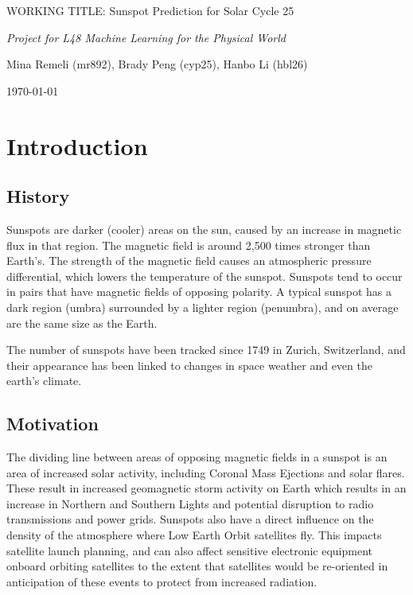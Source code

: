 \documentclass[11pt]{article}
\begin{document}
\centerline{\Large WORKING TITLE: Sunspot Prediction for Solar Cycle 25}
\vspace{2em}
\centerline{\Large \emph{Project for L48 Machine Learning for the Physical World}}
\vspace{2em}
\centerline{\large Mina Remeli (mr892), Brady Peng (cyp25), Hanbo Li (hbl26)}
\vspace{1em}
\centerline{\today}
\vspace{1em}


\section{Introduction}
\subsection{History}
Sunspots are darker (cooler) areas on the sun, caused by an increase in magnetic flux in that region. 
The magnetic field is around 2,500 times stronger than Earth’s. 
The strength of the magnetic field causes an atmospheric pressure differential, which lowers the temperature of the sunspot. 
Sunspots tend to occur in pairs that have magnetic fields of opposing polarity. 
A typical sunspot has a dark region (umbra) surrounded by a lighter region (penumbra), and on average are the same size as the Earth. 

The number of sunspots have been tracked since 1749 in Zurich, Switzerland, and their appearance has been linked to changes in space weather and even the earth’s climate.

\subsection{Motivation}
The dividing line between areas of opposing magnetic fields in a sunspot is an area of increased solar activity, including Coronal Mass Ejections and solar flares. 
These result in increased geomagnetic storm activity on Earth which results in an increase in Northern and Southern Lights and potential disruption to radio transmissions and power grids. 
Sunspots also have a direct influence on the density of the atmosphere where Low Earth Orbit satellites fly. 
This impacts satellite launch planning, and can also affect sensitive electronic equipment onboard orbiting satellites to the extent that satellites would be re-oriented in anticipation of these events to protect from increased radiation.
\end{document}
